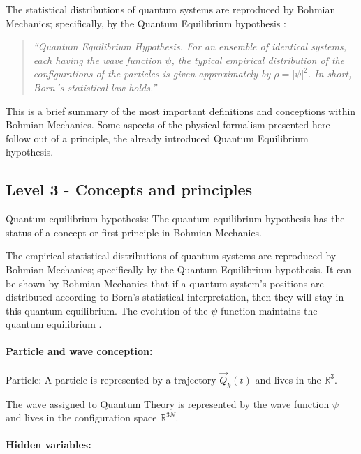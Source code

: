 \documentclass{article}
\begin{document}
The statistical distributions of quantum systems are reproduced by Bohmian Mechanics; specifically, by the Quantum Equilibrium hypothesis \cite[p.153]{durr2009bohmian}: 

\begin{quote}
\textit{``Quantum Equilibrium Hypothesis. For an ensemble of identical systems, each having the wave function $\psi$, the typical empirical distribution of the configurations of the particles is given approximately by $\rho=|\psi|^2$. In short, Born´s statistical law holds.''}
\end{quote}

This is a brief summary of the most important definitions and conceptions within Bohmian Mechanics. Some aspects of the physical formalism presented here follow out of a principle, the already introduced Quantum Equilibrium hypothesis.  

\newpage

\subsection*{Level 3 - Concepts and principles}

Quantum equilibrium hypothesis: The quantum equilibrium hypothesis has the status of a concept or first principle in Bohmian Mechanics. \newline

The empirical statistical distributions of quantum systems are reproduced by Bohmian Mechanics; specifically by the Quantum Equilibrium hypothesis. It can be shown by Bohmian Mechanics that if a quantum system's positions are distributed according to Born's statistical interpretation, then they will stay in this quantum equilibrium. The evolution of the $\psi$ function maintains the quantum equilibrium \cite[p.211ff]{durr2009bohmian}.

\paragraph{Particle and wave conception:}

Particle: A particle is represented by a trajectory $\vec Q_k(t)$ and lives in the $ \mathbb{R}^3$. \newline

The wave assigned to Quantum Theory is represented by the wave function $\psi$ and lives in the configuration space $ \mathbb{R}^{3N}$. 

\paragraph{Hidden variables:}
\end{document}
